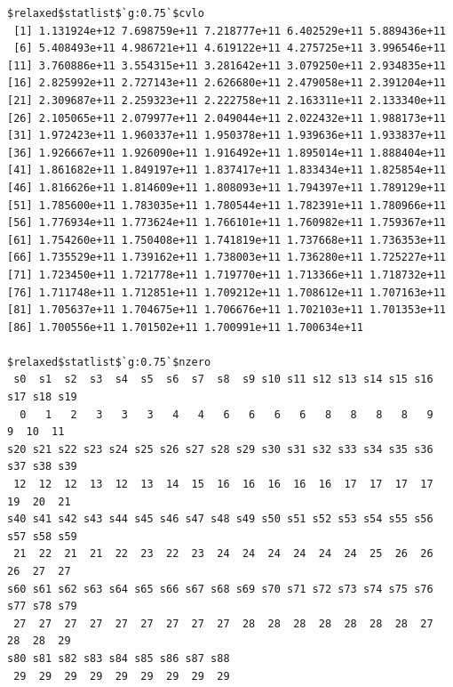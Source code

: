 \documentclass[
]{article}
\begin{document}
\begin{verbatim}
$relaxed$statlist$`g:0.75`$cvlo
 [1] 1.131924e+12 7.698759e+11 7.218777e+11 6.402529e+11 5.889436e+11
 [6] 5.408493e+11 4.986721e+11 4.619122e+11 4.275725e+11 3.996546e+11
[11] 3.760886e+11 3.554315e+11 3.281642e+11 3.079250e+11 2.934835e+11
[16] 2.825992e+11 2.727143e+11 2.626680e+11 2.479058e+11 2.391204e+11
[21] 2.309687e+11 2.259323e+11 2.222758e+11 2.163311e+11 2.133340e+11
[26] 2.105065e+11 2.079977e+11 2.049044e+11 2.022432e+11 1.988173e+11
[31] 1.972423e+11 1.960337e+11 1.950378e+11 1.939636e+11 1.933837e+11
[36] 1.926667e+11 1.926090e+11 1.916492e+11 1.895014e+11 1.888404e+11
[41] 1.861682e+11 1.849197e+11 1.837417e+11 1.833434e+11 1.825854e+11
[46] 1.816626e+11 1.814609e+11 1.808093e+11 1.794397e+11 1.789129e+11
[51] 1.785600e+11 1.783035e+11 1.780544e+11 1.782391e+11 1.780966e+11
[56] 1.776934e+11 1.773624e+11 1.766101e+11 1.760982e+11 1.759367e+11
[61] 1.754260e+11 1.750408e+11 1.741819e+11 1.737668e+11 1.736353e+11
[66] 1.735529e+11 1.739162e+11 1.738003e+11 1.736280e+11 1.725227e+11
[71] 1.723450e+11 1.721778e+11 1.719770e+11 1.713366e+11 1.718732e+11
[76] 1.711748e+11 1.712851e+11 1.709212e+11 1.708612e+11 1.707163e+11
[81] 1.705637e+11 1.704675e+11 1.706676e+11 1.702103e+11 1.701353e+11
[86] 1.700556e+11 1.701502e+11 1.700991e+11 1.700634e+11

$relaxed$statlist$`g:0.75`$nzero
 s0  s1  s2  s3  s4  s5  s6  s7  s8  s9 s10 s11 s12 s13 s14 s15 s16 s17 s18 s19 
  0   1   2   3   3   3   4   4   6   6   6   6   8   8   8   8   9   9  10  11 
s20 s21 s22 s23 s24 s25 s26 s27 s28 s29 s30 s31 s32 s33 s34 s35 s36 s37 s38 s39 
 12  12  12  13  12  13  14  15  16  16  16  16  16  17  17  17  17  19  20  21 
s40 s41 s42 s43 s44 s45 s46 s47 s48 s49 s50 s51 s52 s53 s54 s55 s56 s57 s58 s59 
 21  22  21  21  22  23  22  23  24  24  24  24  24  24  25  26  26  26  27  27 
s60 s61 s62 s63 s64 s65 s66 s67 s68 s69 s70 s71 s72 s73 s74 s75 s76 s77 s78 s79 
 27  27  27  27  27  27  27  27  27  28  28  28  28  28  28  28  27  28  28  29 
s80 s81 s82 s83 s84 s85 s86 s87 s88 
 29  29  29  29  29  29  29  29  29 



\end{verbatim}
\end{document}
